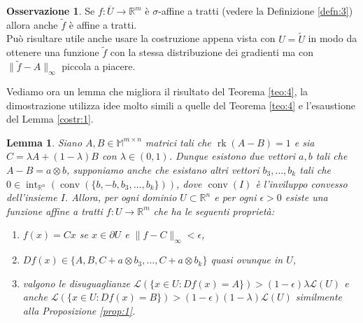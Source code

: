 \documentclass[a4paper,11pt]{book}
\theoremstyle{plain}
\newtheorem{lemma}[teo]{Lemma}
\theoremstyle{definition}
\newtheorem{oss}[defn]{Osservazione}
\theoremstyle{remark}
\newcommand{\R}{\mathbb{R}}
\newcommand{\M}{\mathbb{M}}
\newcommand{\LL}{\mathscr{L}}
\newcommand{\norm}[1]{\lVert#1\rVert}
\DeclareMathOperator{\rk}{rk}
\DeclareMathOperator{\Int}{int}
\DeclareMathOperator{\conv}{conv}
\begin{document}
\begin{oss}
	Se $f:\overline{U}\to\R^m$ è $\sigma$-affine a tratti (vedere la Definizione \ref{defn:3}) allora anche $\widetilde{f}$ è affine a tratti.\\
	Può risultare utile anche usare la costruzione appena vista con $U=\widetilde{U}$ in modo da ottenere una funzione $\widetilde{f}$ con la stessa distribuzione dei gradienti ma con $\norm{\widetilde{f}-A}_{\infty}$ piccola a piacere.
\end{oss}
Vediamo ora un lemma che migliora il risultato del Teorema \ref{teo:4}, la dimostrazione utilizza idee molto simili a quelle del Teorema \ref{teo:4} e l'esaustione del Lemma \ref{costr:1}.
\begin{lemma}\label{lemma:5}
	Siano $A,B\in \M^{m\times n}$ matrici tali che $\rk(A-B)=1$ e sia $C=\lambda A+(1-\lambda)B$ con $\lambda\in(0,1)$. Dunque esistono due vettori $a,b$ tali che $A-B=a\otimes b$, supponiamo anche che esistano altri vettori $b_{3},\ldots,b_{k}$ tali che $0\in\Int_{\R^{n}}(\conv(\{b,-b,b_{3},\ldots,b_{k}\}))$, dove $\conv(I)$ è l'inviluppo convesso dell'insieme $I$. Allora, per ogni dominio $U\subset \R^{n}$ e per ogni $\epsilon>0$ esiste una funzione affine a tratti $f:U\to\R^{m}$ che ha le seguenti proprietà:
	\begin{enumerate}[1)]
		\item $f(x)=Cx$ se $x\in\partial U$ e $\norm{f-C}_{\infty}<\epsilon$,{}
		\item $Df(x)\in\{A,B,C+a\otimes b_{3},\ldots,C+a\otimes b_{k}\}$ quasi ovunque in $U$,
		\item valgono le disuguaglianze $\LL(\{x\in U : Df(x)=A\})>(1-\epsilon)\lambda\LL(U)$ e anche $\LL(\{x\in U : Df(x)=B\})>(1-\epsilon)(1-\lambda)\LL(U)$ similmente alla Proposizione \ref{prop:1}.
	\end{enumerate}
\end{lemma}
\end{document}
